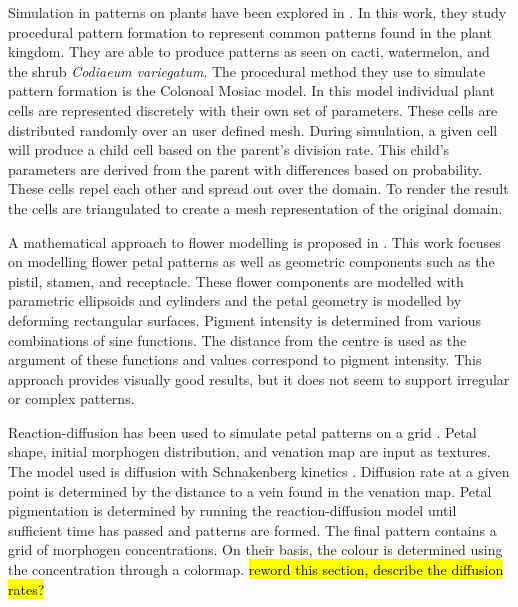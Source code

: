 Simulation in patterns on plants have been explored in \cite{}. In this work, they study procedural pattern formation to represent common patterns found in the plant kingdom. They are able to produce patterns as seen on cacti, watermelon, and the shrub \textit{Codiaeum variegatum}. The procedural method they use to simulate pattern formation is the Colonoal Mosiac model. In this model individual plant cells are represented discretely with their own set of parameters. These cells are distributed randomly over an user defined mesh. During simulation, a given cell will produce a child cell based on the parent's division rate. This child's parameters are derived from the parent with differences based on probability. These cells repel each other and spread out over the domain. To render the result the cells are triangulated to create a mesh representation of the original domain. 

A mathematical approach to flower modelling is proposed in \cite{lu2014}. This work focuses on modelling flower petal patterns as well as geometric components such as the pistil, stamen, and receptacle. These flower components are modelled with parametric ellipsoids and cylinders and the petal geometry is modelled by deforming rectangular surfaces. Pigment intensity is determined from various combinations of sine functions. The distance from the centre is used as the argument of these functions and values correspond to pigment intensity. This approach provides visually good results, but it does not seem to support irregular or complex patterns.

Reaction-diffusion has been used to simulate petal patterns on a grid \cite{Zhou2007}. Petal shape, initial morphogen distribution, and venation map are input as textures. The model used is diffusion with Schnakenberg kinetics \cite{schnakenberg1979}. Diffusion rate at a given point is determined by the distance to a vein found in the venation map. Petal pigmentation is determined by running the reaction-diffusion model until sufficient time has passed and patterns are formed. The final pattern contains a grid of morphogen concentrations. On their basis, the colour is determined using the concentration through a colormap. \hl{reword this section, describe the diffusion rates?} 


